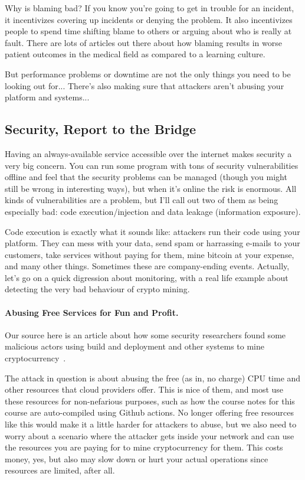 Why is blaming bad? If you know you're going to get in trouble for an incident, it incentivizes covering up incidents or denying the problem. It also incentivizes people to spend time shifting blame to others or arguing about who is really at fault. There are lots of articles out there about how blaming results in worse patient outcomes in the medical field as compared to a learning culture.

But performance problems or downtime are not the only things you need to be looking out for... There's also making sure that attackers aren't abusing your platform and systems...

\subsection*{Security, Report to the Bridge}
Having an always-available service accessible over the internet makes security a very big concern. You can run some program with tons of security vulnerabilities offline and feel that the security problems can be managed (though you might still be wrong in interesting ways), but when it's online the risk is enormous. All kinds of vulnerabilities are a problem, but I'll call out two of them as being especially bad: code execution/injection and data leakage (information exposure). 

Code execution is exactly what it sounds like: attackers run their code using your platform. They can mess with your data, send spam or harrassing e-mails to your customers, take services without paying for them, mine bitcoin at your expense, and many other things. Sometimes these are company-ending events. Actually, let's go on a quick digression about monitoring, with a real life example about detecting the very bad behaviour of crypto mining.

\paragraph{Abusing Free Services for Fun and Profit.}
Our source here is an article about how some security researchers found some malicious actors using build and deployment and other systems to mine cryptocurrency~\cite{sysdig}.

The attack in question is about abusing the free (as in, no charge) CPU time and other resources that cloud providers offer. This is nice of them, and most use these resources for non-nefarious purposes, such as how the course notes for this course are auto-compiled using Github actions. No longer offering free resources like this would make it a little harder for attackers to abuse, but we also need to worry about a scenario where the attacker gets inside your network and can use the resources you are paying for to mine cryptocurrency for them. This costs money, yes, but also may slow down or hurt your actual operations since resources are limited, after all.

